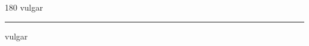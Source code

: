 
\begin{frame}
\begin{center}
\begin{turn}{180}
{\fontsize{2.5cm}{1em}\selectfont vulgar}
\end{turn}
\vspace{1em}\par  
\hrule
\vspace{1em}\par  
{\fontsize{2.5cm}{1em}\selectfont vulgar}
\end{center}
\end{frame}

